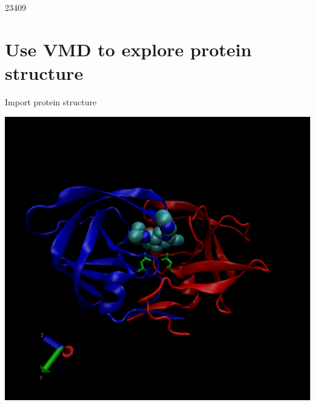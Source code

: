 \documentclass[
]{article}
\begin{document}
23409

\hypertarget{use-vmd-to-explore-protein-structure}{%
\section{Use VMD to explore protein
structure}\label{use-vmd-to-explore-protein-structure}}

Import protein structure

\includegraphics{my_structure.png}
\end{document}
